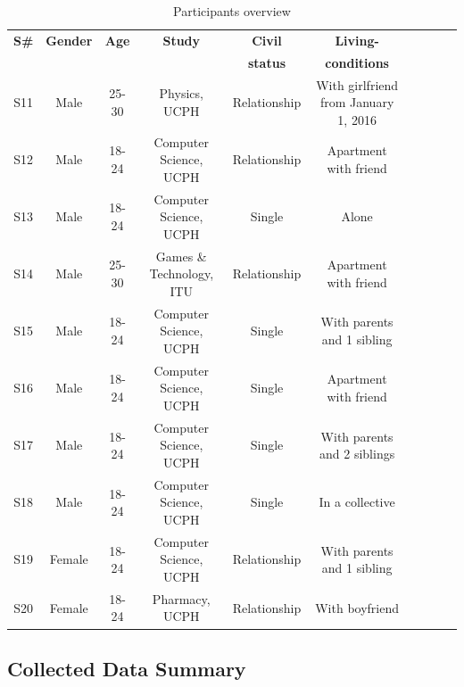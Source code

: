 \documentclass[12pt]{article} %
\begin{document}
\begin{table}[H]
\center
\begin{footnotesize}
	\begin{tabular}{| c | c | c | c | c | c | c | c | c | c |}
	\hline
	\textbf{S\#} & \textbf{Gender} & \textbf{Age} & \textbf{Study} & \textbf{Civil} & \textbf{Living-}\\
	 & \textbf{} & \textbf{} & \textbf{} & \textbf{status} & \textbf{conditions} \\
	
	\hline
	S11 & Male & 25-30 & Physics, UCPH & Relationship & With girlfriend from January 1, 2016 \\
	\hline
	S12 & Male & 18-24 & Computer Science, UCPH & Relationship & Apartment with friend\\
	\hline
	S13 & Male & 18-24 & Computer Science, UCPH & Single & Alone \\
	\hline
	S14 & Male & 25-30 & Games \& Technology, ITU & Relationship & Apartment with friend \\
	\hline
	S15 & Male & 18-24 & Computer Science, UCPH & Single & With parents  and 1 sibling\\
	\hline
	S16 & Male & 18-24 &  Computer Science, UCPH & Single & Apartment with friend\\
	\hline
	S17 & Male & 18-24 & Computer Science, UCPH & Single & With parents and 2 siblings \\
	\hline
	S18 & Male & 18-24 & Computer Science, UCPH & Single & In a collective\\
	\hline
	S19 & Female & 18-24 & Computer Science, UCPH & Relationship & With parents and 1 sibling\\
	\hline
	S20 & Female & 18-24 & Pharmacy, UCPH & Relationship & With boyfriend\\
	\hline
	\end{tabular}
	\caption{Participants overview}
	\label{tab:partOv}
\end{footnotesize}
\end{table}



\subsection{Collected Data Summary}
\end{document}
